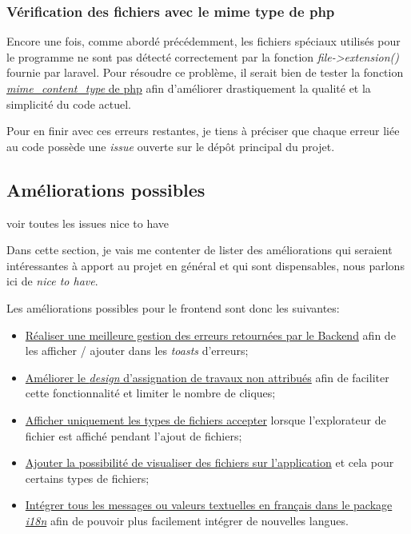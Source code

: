 \documentclass[
    iai, %
    il, %
]{heig-tb}
\begin{document}
\subsubsection{Vérification des fichiers avec le mime type de php}
Encore une fois, comme abordé précédemment, les fichiers spéciaux utilisés pour le programme ne sont pas détecté correctement par la fonction \emph{file->extension()} fournie par \Gls{laravel}.
Pour résoudre ce problème, il serait bien de tester la fonction \href{https://www.php.net/manual/fr/function.mime-content-type.php}{\emph{mime\_content\_type} de \Gls{php}} afin d'améliorer drastiquement la qualité et la simplicité du code actuel.

Pour en finir avec ces erreurs restantes, je tiens à préciser que chaque erreur liée au code possède une \emph{issue} ouverte sur le dépôt principal du projet.

\subsection{Améliorations possibles}
voir toutes les issues nice to have

Dans cette section, je vais me contenter de lister des améliorations qui seraient intéressantes à apport au projet en général et qui sont dispensables, nous parlons ici de \emph{nice to have}.

Les améliorations possibles pour le \Gls{frontend} sont donc les suivantes:
\begin{itemize}
    \item \href{https://github.com/heig-fablab/fablab-manager/issues/78}{Réaliser une meilleure gestion des erreurs retournées par le Backend} afin de les afficher / ajouter dans les \emph{toasts} d'erreurs;
    \item \href{https://github.com/heig-fablab/fablab-manager/issues/141}{Améliorer le \emph{design} d'assignation de travaux non attribués} afin de faciliter cette fonctionnalité et limiter le nombre de cliques;
    \item \href{https://github.com/heig-fablab/fablab-manager/issues/156}{Afficher uniquement les types de fichiers accepter} lorsque l'explorateur de fichier est affiché pendant l'ajout de fichiers;
    \item \href{https://github.com/heig-fablab/fablab-manager/issues/122}{Ajouter la possibilité de visualiser des fichiers sur l'application} et cela pour certains types de fichiers;
    \item \href{https://github.com/heig-fablab/fablab-manager/issues/74}{Intégrer tous les messages ou valeurs textuelles en français dans le package \emph{i18n}} afin de pouvoir plus facilement intégrer de nouvelles langues.
\end{itemize}
\end{document}
